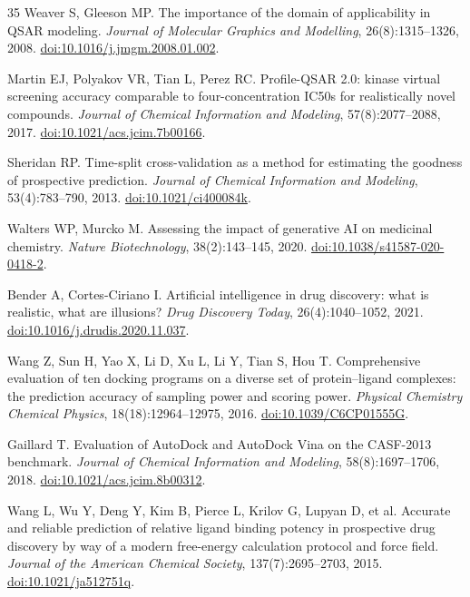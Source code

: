 \documentclass[11pt]{article}
\begin{document}
\begin{thebibliography}{35}
Weaver S, Gleeson MP.
The importance of the domain of applicability in QSAR modeling.
\textit{Journal of Molecular Graphics and Modelling}, 26(8):1315--1326, 2008.
\href{https://doi.org/10.1016/j.jmgm.2008.01.002}{doi:10.1016/j.jmgm.2008.01.002}.

Martin EJ, Polyakov VR, Tian L, Perez RC.
Profile-QSAR 2.0: kinase virtual screening accuracy comparable to four-concentration IC50s for realistically novel compounds.
\textit{Journal of Chemical Information and Modeling}, 57(8):2077--2088, 2017.
\href{https://doi.org/10.1021/acs.jcim.7b00166}{doi:10.1021/acs.jcim.7b00166}.

Sheridan RP.
Time-split cross-validation as a method for estimating the goodness of prospective prediction.
\textit{Journal of Chemical Information and Modeling}, 53(4):783--790, 2013.
\href{https://doi.org/10.1021/ci400084k}{doi:10.1021/ci400084k}.

Walters WP, Murcko M.
Assessing the impact of generative AI on medicinal chemistry.
\textit{Nature Biotechnology}, 38(2):143--145, 2020.
\href{https://doi.org/10.1038/s41587-020-0418-2}{doi:10.1038/s41587-020-0418-2}.

Bender A, Cortes-Ciriano I.
Artificial intelligence in drug discovery: what is realistic, what are illusions?
\textit{Drug Discovery Today}, 26(4):1040--1052, 2021.
\href{https://doi.org/10.1016/j.drudis.2020.11.037}{doi:10.1016/j.drudis.2020.11.037}.

Wang Z, Sun H, Yao X, Li D, Xu L, Li Y, Tian S, Hou T.
Comprehensive evaluation of ten docking programs on a diverse set of protein--ligand complexes: the prediction accuracy of sampling power and scoring power.
\textit{Physical Chemistry Chemical Physics}, 18(18):12964--12975, 2016.
\href{https://doi.org/10.1039/C6CP01555G}{doi:10.1039/C6CP01555G}.

Gaillard T.
Evaluation of AutoDock and AutoDock Vina on the CASF-2013 benchmark.
\textit{Journal of Chemical Information and Modeling}, 58(8):1697--1706, 2018.
\href{https://doi.org/10.1021/acs.jcim.8b00312}{doi:10.1021/acs.jcim.8b00312}.

Wang L, Wu Y, Deng Y, Kim B, Pierce L, Krilov G, Lupyan D, et al.
Accurate and reliable prediction of relative ligand binding potency in prospective drug discovery by way of a modern free-energy calculation protocol and force field.
\textit{Journal of the American Chemical Society}, 137(7):2695--2703, 2015.
\href{https://doi.org/10.1021/ja512751q}{doi:10.1021/ja512751q}.


\end{thebibliography}
\end{document}
